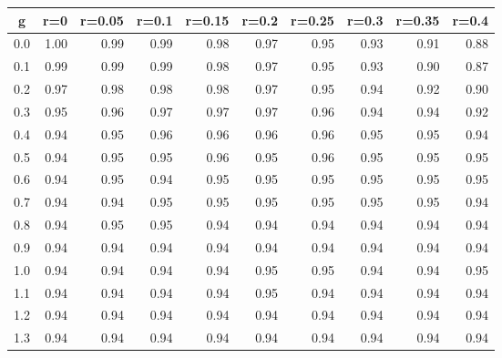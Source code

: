 %
\begin{table}[!tbp]
 \begin{center}
 \begin{tabular}{rrrrrrrrrr}\hline\hline
\multicolumn{1}{c}{g}&\multicolumn{1}{c}{r=0}&\multicolumn{1}{c}{r=0.05}&\multicolumn{1}{c}{r=0.1}&\multicolumn{1}{c}{r=0.15}&\multicolumn{1}{c}{r=0.2}&\multicolumn{1}{c}{r=0.25}&\multicolumn{1}{c}{r=0.3}&\multicolumn{1}{c}{r=0.35}&\multicolumn{1}{c}{r=0.4}\tabularnewline
\hline
0.0&1.00&0.99&0.99&0.98&0.97&0.95&0.93&0.91&0.88\tabularnewline
0.1&0.99&0.99&0.99&0.98&0.97&0.95&0.93&0.90&0.87\tabularnewline
0.2&0.97&0.98&0.98&0.98&0.97&0.95&0.94&0.92&0.90\tabularnewline
0.3&0.95&0.96&0.97&0.97&0.97&0.96&0.94&0.94&0.92\tabularnewline
0.4&0.94&0.95&0.96&0.96&0.96&0.96&0.95&0.95&0.94\tabularnewline
0.5&0.94&0.95&0.95&0.96&0.95&0.96&0.95&0.95&0.95\tabularnewline
0.6&0.94&0.95&0.94&0.95&0.95&0.95&0.95&0.95&0.95\tabularnewline
0.7&0.94&0.94&0.95&0.95&0.95&0.95&0.95&0.95&0.94\tabularnewline
0.8&0.94&0.95&0.95&0.94&0.94&0.94&0.94&0.94&0.94\tabularnewline
0.9&0.94&0.94&0.94&0.94&0.94&0.94&0.94&0.94&0.94\tabularnewline
1.0&0.94&0.94&0.94&0.94&0.95&0.95&0.94&0.94&0.95\tabularnewline
1.1&0.94&0.94&0.94&0.94&0.95&0.94&0.94&0.94&0.94\tabularnewline
1.2&0.94&0.94&0.94&0.94&0.94&0.94&0.94&0.94&0.94\tabularnewline
1.3&0.94&0.94&0.94&0.94&0.94&0.94&0.94&0.94&0.94\tabularnewline
\hline
\end{tabular}

\end{center}

\end{table}

